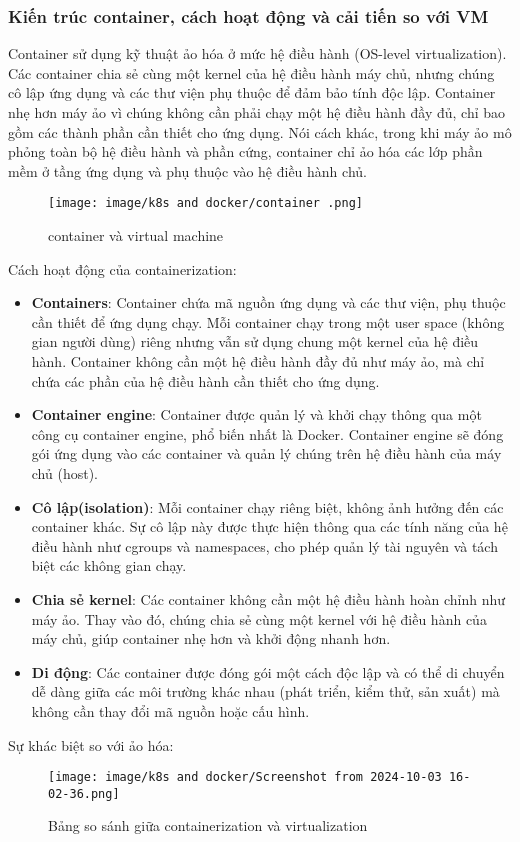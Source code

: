 \documentclass[a4paper,12pt]{article}
\begin{document}
\subsubsection{ Kiến trúc container, cách hoạt động và cải tiến so với VM} 
Container sử dụng kỹ thuật ảo hóa ở mức hệ điều hành (OS-level virtualization). Các container chia sẻ cùng một kernel của hệ điều hành máy chủ, nhưng chúng cô lập ứng dụng và các thư viện phụ thuộc để đảm bảo tính độc lập. 
Container nhẹ hơn máy ảo vì chúng không cần phải chạy một hệ điều hành đầy đủ, chỉ bao gồm các thành phần cần thiết cho ứng dụng.
Nói cách khác, trong khi máy ảo mô phỏng toàn bộ hệ điều hành và phần cứng, container chỉ ảo hóa các lớp phần mềm ở tầng ứng dụng và phụ thuộc vào hệ điều hành chủ.

\begin{figure}[h]
    \centering
    \texttt{[image: image/k8s and docker/container .png]}
    \caption{container và virtual machine}
    \label{fig:ten_hinh}
\end{figure}

Cách hoạt động của containerization:
\begin{itemize}
    \item \textbf{Containers}: Container chứa mã nguồn ứng dụng và các thư viện, phụ thuộc cần thiết để ứng dụng chạy. Mỗi container chạy trong một user space (không gian người dùng) riêng nhưng vẫn sử dụng chung một kernel của hệ điều hành. Container không cần một hệ điều hành đầy đủ như máy ảo, mà chỉ chứa các phần của hệ điều hành cần thiết cho ứng dụng.
    \item \textbf{Container engine}: Container được quản lý và khởi chạy thông qua một công cụ container engine, phổ biến nhất là Docker. Container engine sẽ đóng gói ứng dụng vào các container và quản lý chúng trên hệ điều hành của máy chủ (host).
    \item \textbf{Cô lập(isolation)}: Mỗi container chạy riêng biệt, không ảnh hưởng đến các container khác. Sự cô lập này được thực hiện thông qua các tính năng của hệ điều hành như cgroups và namespaces, cho phép quản lý tài nguyên và tách biệt các không gian chạy.
    \item \textbf{Chia sẻ kernel}: Các container không cần một hệ điều hành hoàn chỉnh như máy ảo. Thay vào đó, chúng chia sẻ cùng một kernel với hệ điều hành của máy chủ, giúp container nhẹ hơn và khởi động nhanh hơn.
    \item \textbf{Di động}: Các container được đóng gói một cách độc lập và có thể di chuyển dễ dàng giữa các môi trường khác nhau (phát triển, kiểm thử, sản xuất) mà không cần thay đổi mã nguồn hoặc cấu hình.
\end{itemize}
Sự khác biệt so với ảo hóa:
\begin{figure}[h]
    \centering
    \texttt{[image: image/k8s and docker/Screenshot from 2024-10-03 16-02-36.png]}
    \caption{Bảng so sánh giữa containerization và virtualization}
    \label{fig:ten_hinh}
\end{figure}
\end{document}
